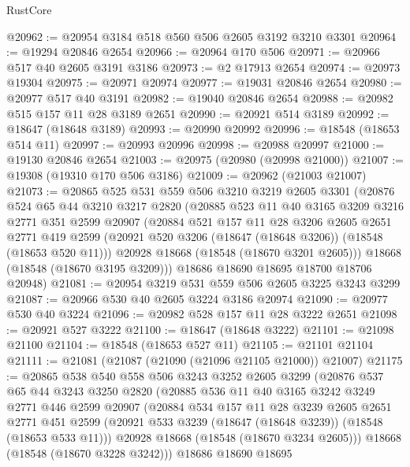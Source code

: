 \begin{lexlean}{RustCore}
\begin{coremodule}
@20962 := @20954 @3184 @518 @560 @506 @2605 @3192 @3210 @3301
@20964 := @19294 @20846 @2654
@20966 := @20964 @170 @506
@20971 := @20966 @517 @40 @2605 @3191 @3186
@20973 := @2 @17913 @2654
@20974 := @20973 @19304
@20975 := @20971 @20974
@20977 := @19031 @20846 @2654
@20980 := @20977 @517 @40 @3191
@20982 := @19040 @20846 @2654
@20988 := @20982 @515 @157 @11 @28 @3189 @2651
@20990 := @20921 @514 @3189
@20992 := @18647 (@18648 @3189)
@20993 := @20990 @20992
@20996 := @18548 (@18653 @514 @11)
@20997 := @20993 @20996
@20998 := @20988 @20997
@21000 := @19130 @20846 @2654
@21003 := @20975 (@20980 (@20998 @21000))
@21007 := @19308 (@19310 @170 @506 @3186)
@21009 := @20962 (@21003 @21007)
@21073 := @20865
    @525
    @531
    @559
    @506
    @3210
    @3219
    @2605
    @3301
    (@20876
      @524
      @65
      @44
      @3210
      @3217
      @2820
      (@20885
        @523
        @11
        @40
        @3165
        @3209
        @3216
        @2771
        @351
        @2599
        @20907
        (@20884
          @521
          @157
          @11
          @28
          @3206
          @2605
          @2651
          @2771
          @419
          @2599
          (@20921 @520 @3206 (@18647 (@18648 @3206)) (@18548 (@18653 @520 @11)))
          @20928
          @18668
          (@18548 (@18670 @3201 @2605)))
        @18668
        (@18548 (@18670 @3195 @3209)))
      @18686
      @18690
      @18695
      @18700
      @18706
      @20948)
@21081 := @20954 @3219 @531 @559 @506 @2605 @3225 @3243 @3299
@21087 := @20966 @530 @40 @2605 @3224 @3186 @20974
@21090 := @20977 @530 @40 @3224
@21096 := @20982 @528 @157 @11 @28 @3222 @2651
@21098 := @20921 @527 @3222
@21100 := @18647 (@18648 @3222)
@21101 := @21098 @21100
@21104 := @18548 (@18653 @527 @11)
@21105 := @21101 @21104
@21111 := @21081 (@21087 (@21090 (@21096 @21105 @21000)) @21007)
@21175 := @20865
    @538
    @540
    @558
    @506
    @3243
    @3252
    @2605
    @3299
    (@20876
      @537
      @65
      @44
      @3243
      @3250
      @2820
      (@20885
        @536
        @11
        @40
        @3165
        @3242
        @3249
        @2771
        @446
        @2599
        @20907
        (@20884
          @534
          @157
          @11
          @28
          @3239
          @2605
          @2651
          @2771
          @451
          @2599
          (@20921 @533 @3239 (@18647 (@18648 @3239)) (@18548 (@18653 @533 @11)))
          @20928
          @18668
          (@18548 (@18670 @3234 @2605)))
        @18668
        (@18548 (@18670 @3228 @3242)))
      @18686
      @18690
      @18695

\end{coremodule}
\end{lexlean}
